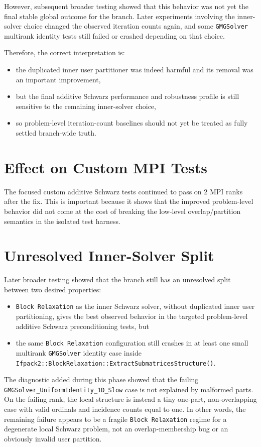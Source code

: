 \documentclass[11pt]{article}
\begin{document}
However, subsequent broader testing showed that this behavior was not yet the final stable global outcome for the branch. Later experiments involving the inner-solver choice changed the observed iteration counts again, and some \texttt{GMGSolver} multirank identity tests still failed or crashed depending on that choice.

Therefore, the correct interpretation is:
\begin{itemize}
  \item the duplicated inner user partitioner was indeed harmful and its removal was an important improvement,
  \item but the final additive Schwarz performance and robustness profile is still sensitive to the remaining inner-solver choice,
  \item so problem-level iteration-count baselines should not yet be treated as fully settled branch-wide truth.
\end{itemize}

\section{Effect on Custom MPI Tests}
The focused custom additive Schwarz tests continued to pass on 2 MPI ranks after the fix. This is important because it shows that the improved problem-level behavior did not come at the cost of breaking the low-level overlap/partition semantics in the isolated test harness.

\section{Unresolved Inner-Solver Split}
    Later broader testing showed that the branch still has an unresolved split between two desired properties:
    \begin{itemize}
      \item \texttt{Block Relaxation} as the inner Schwarz solver, without duplicated inner user partitioning, gives the best observed behavior in the targeted problem-level additive Schwarz preconditioning tests, but
      \item the same \texttt{Block Relaxation} configuration still crashes in at least one small multirank \texttt{GMGSolver} identity case inside \texttt{Ifpack2::BlockRelaxation::ExtractSubmatricesStructure()}.
    \end{itemize}
    
    The diagnostic added during this phase showed that the failing \texttt{GMGSolver\_UniformIdentity\_1D\_Slow} case is not explained by malformed parts. On the failing rank, the local structure is instead a tiny one-part, non-overlapping case with valid ordinals and incidence counts equal to one. In other words, the remaining failure appears to be a fragile \texttt{Block Relaxation} regime for a degenerate local Schwarz problem, not an overlap-membership bug or an obviously invalid user partition.
    
\end{document}
